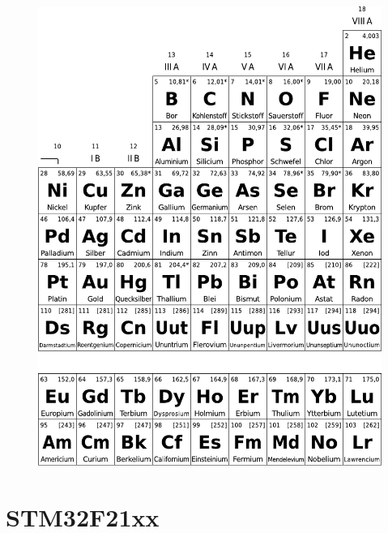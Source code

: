 \begin{appendices}
	\begin{figure}
	\centering
	\includegraphics[width=\textwidth]{periodensystem_2.pdf}
	\end{figure}

	\chapter{STM32F21xx}\label{sec:stm32f21xx}
	
	\newpage

\end{appendices}
